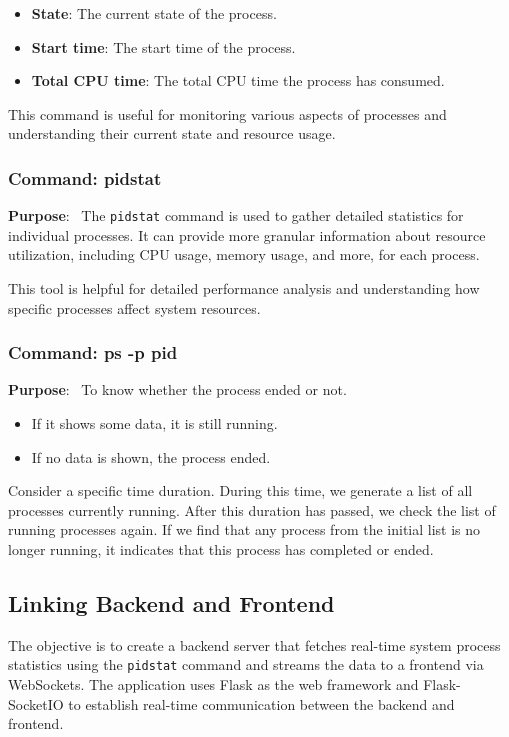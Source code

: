 \documentclass[12pt]{article}
\begin{document}
\begin{itemize}
    \item \textbf{State}: The current state of the process.
    \item \textbf{Start time}: The start time of the process.
    \item \textbf{Total CPU time}: The total CPU time the process has consumed.
\end{itemize}

This command is useful for monitoring various aspects of processes and understanding their current state and resource usage.

\subsubsection{Command: pidstat}

\textbf{Purpose}: \
The \texttt{pidstat} command is used to gather detailed statistics for individual processes. It can provide more granular information about resource utilization, including CPU usage, memory usage, and more, for each process.

This tool is helpful for detailed performance analysis and understanding how specific processes affect system resources.

\subsubsection{Command: ps -p pid}
\textbf{Purpose}: \
To know whether the process ended or not.
 \begin{itemize}
    \item If it shows some data, it is still running.
    \item If no data is shown, the process ended.
 \end{itemize}
Consider a specific time duration. During this time, we generate a list of all processes currently running. After this duration has passed, we check the list of running processes again. If we find that any process from the initial list is no longer running, it indicates that this process has completed or ended.

\subsection{Linking Backend and Frontend}
The objective is to create a backend server that fetches real-time system process statistics using the \texttt{pidstat} command and streams the data to a frontend via WebSockets. The application uses Flask as the web framework and Flask-SocketIO to establish real-time communication between the backend and frontend.
\end{document}
